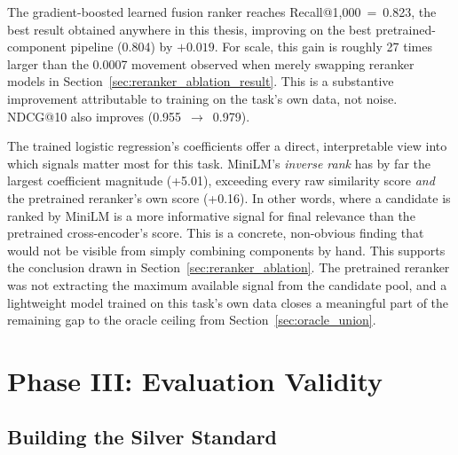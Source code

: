 \documentclass[a4paper,oneside,bibliography=totoc]{scrbook}
\begin{document}
The gradient-boosted learned fusion ranker reaches Recall@1{,}000~=~0.823, the best result obtained anywhere in this thesis, improving on the best pretrained-component pipeline (0.804) by $+0.019$. For scale, this gain is roughly 27 times larger than the 0.0007 movement observed when merely swapping reranker models in Section~\ref{sec:reranker_ablation_result}. This is a substantive improvement attributable to training on the task's own data, not noise. NDCG@10 also improves (0.955~$\to$~0.979).

The trained logistic regression's coefficients offer a direct, interpretable view into which signals matter most for this task. MiniLM's \emph{inverse rank} has by far the largest coefficient magnitude (+5.01), exceeding every raw similarity score \emph{and} the pretrained reranker's own score (+0.16). In other words, where a candidate is ranked by MiniLM is a more informative signal for final relevance than the pretrained cross-encoder's score. This is a concrete, non-obvious finding that would not be visible from simply combining components by hand. This supports the conclusion drawn in Section~\ref{sec:reranker_ablation}. The pretrained reranker was not extracting the maximum available signal from the candidate pool, and a lightweight model trained on this task's own data closes a meaningful part of the remaining gap to the oracle ceiling from Section~\ref{sec:oracle_union}.

\section{Phase III: Evaluation Validity}
\label{sec:phase3_result}

\subsection{Building the Silver Standard}
\label{subsec:pooled_gold_standard_result}
\end{document}
